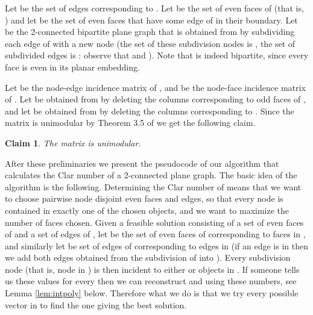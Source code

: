 \documentclass{article}
\newtheorem{claim}{Claim}
\begin{document}
\newcommand{\Feven}{\ensuremath{F_{even}}}

Let  be the set of edges corresponding to
  . Let  be the set of even faces of  (that is,
  ) and let  be the set of
  even faces that have some edge of  in their boundary.
 Let  be the 2-connected bipartite plane
  graph that is obtained from  by subdividing each edge of  with
  a new node (the set of these subdivision nodes is , the set of
  subdivided edges is : observe that  and ). Note that  is indeed bipartite, since every face is even in its planar embedding. 

Let  be the node-edge incidence matrix of , and  be the
node-face incidence matrix of . Let  be obtained from  by
deleting the columns corresponding to odd faces of , and let  be
obtained from  by deleting the columns corresponding to . Since the matrix  is unimodular by Theorem  3.5 of \cite{abeledo2007unimodularity} we get the following claim.

\begin{claim} \label{cl:unimod}
The matrix  is unimodular.
\end{claim}

After these preliminaries we present the pseudocode of our algorithm
that calculates the Clar number of a 2-connected plane graph. The
basic idea of the algorithm is the following. Determining the Clar
number of  means that we want to choose pairwise node disjoint even
faces and edges, so that every node is contained in exactly one of the
chosen objects, and we want to maximize the number of faces
chosen. Given a feasible solution consisting of a set  of even
faces of  and a set  of edges of , let  be the set of
even faces of  corresponding to faces in , and similarly let
 be set of edges of  corresponding to edges in  (if an
edge  is in  then we add both edges obtained from the
subdivision of  into ). Every subdivision node (that is, node
in ) is then incident to either  or  objects in . If someone tells us these  values for every 
then we can reconstruct  and  using these numbers, see Lemma
\ref{lem:intpoly} below. Therefore what we do is that we try every
possible vector in  to find the one giving the best
solution.
\end{document}
